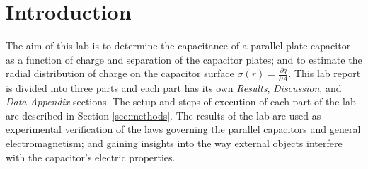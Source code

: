 \section{Introduction}

The aim of this lab is to determine the capacitance of a parallel plate capacitor as a function of charge and separation of the capacitor plates; and to estimate the radial distribution of charge on the capacitor surface $\sigma(r) = \frac{\partial q}{\partial A}$. This lab report is divided into three parts and each part has its own \textit{Results}, \textit{Discussion}, and \textit{Data Appendix} sections. The setup and steps of execution of each part of the lab are described in Section \ref{sec:methods}. The results of the lab are used as experimental verification of the laws governing the parallel capacitors and general electromagnetism; and gaining insights into the way external objects interfere with the capacitor's electric properties.
